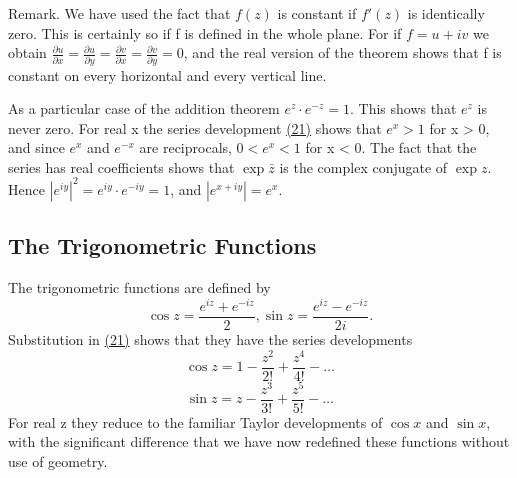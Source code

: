 Remark. We have used the fact that $f(z)$ is constant if $f'(z)$ is identically zero. This is certainly so if f is defined in the whole plane. For if $f = u + iv$ we obtain $\frac{\partial u}{\partial x} = \frac{\partial u}{\partial y} = \frac{\partial v}{\partial x} = \frac{\partial v}{\partial y} = 0$, and the real version of the theorem shows that f is constant on every horizontal and every vertical line.

As a particular case of the addition theorem $e^{z} \cdot e^{-z} = 1$. This shows that $e^{z}$ is never zero. For real x the series development \hyperref[eq:2.21]{(21)} shows that $e^{x} > 1$ for x > 0, and since $e^{x}$ and $e^{-x}$ are reciprocals, $0 < e^{x} < 1$ for x < 0. The fact that the series has real coefficients shows that $\exp \bar{z}$ is the complex conjugate of $\exp z$. Hence $|e^{iy}|^{2} = e^{iy} \cdot e^{-iy} = 1$, and $|e^{x+iy}| = e^{x}$.

\setcounter{section}{3}\setcounter{subsection}{1}\subsection{The Trigonometric Functions}\label{sec:2.3.2}
The trigonometric functions are defined by
\begin{equation*}
\cos z = \frac {e ^ {i z} + e ^ {- i z}}{2}, \sin z = \frac {e ^ {i z} - e ^ {- i z}}{2 i}.\tag{23}\label{eq:2.23}
\end{equation*}
Substitution in \hyperref[eq:2.21]{(21)} shows that they have the series developments
\begin{equation*}
\cos z = 1 - \frac {z ^ {2}}{2 !} + \frac {z ^ {4}}{4 !} - \dots
\end{equation*}
\begin{equation*}
\sin z = z - \frac {z ^ {3}}{3 !} + \frac {z ^ {5}}{5 !} - \dots
\end{equation*}
For real z they reduce to the familiar Taylor developments of $\cos x$ and $\sin x$, with the significant difference that we have now redefined these functions without use of geometry.

